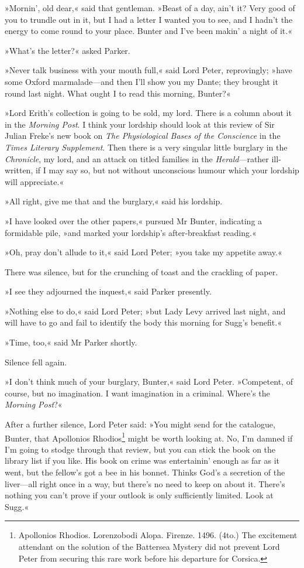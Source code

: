 »Mornin', old dear,« said that gentleman. »Beast of a day, ain't it? Very good of you to trundle out in it, but I had a letter I wanted you to see, and I hadn't the energy to come round to your place. Bunter and I've been makin' a night of it.«

»What's the letter?« asked Parker.

»Never talk business with your mouth full,« said Lord Peter, reprovingly; »have some Oxford marmalade\allowbreak---\allowbreak and then I'll show you my Dante; they brought it round last night. What ought I to read this morning, Bunter?«

»Lord Erith's collection is going to be sold, my lord. There is a column about it in the \textit{Morning Post}. I think your lordship should look at this review of Sir Julian Freke's new book on \textit{The Physiological Bases of the Conscience} in the \textit{Times Literary Supplement}. Then there is a very singular little burglary in the \textit{Chronicle}, my lord, and an attack on titled families in the \textit{Herald}---rather ill-written, if I may say so, but not without unconscious humour which your lordship will appreciate.«

»All right, give me that and the burglary,« said his lordship.

»I have looked over the other papers,« pursued Mr Bunter, indicating a formidable pile, »and marked your lordship's after-breakfast reading.«

»Oh, pray don't allude to it,« said Lord Peter; »you take my appetite away.«

There was silence, but for the crunching of toast and the crackling of paper.

»I see they adjourned the inquest,« said Parker presently.

»Nothing else to do,« said Lord Peter; »but Lady Levy arrived last night, and will have to go and fail to identify the body this morning for Sugg's benefit.«

»Time, too,« said Mr Parker shortly.

Silence fell again.

»I don't think much of your burglary, Bunter,« said Lord Peter. »Competent, of course, but no imagination. I want imagination in a criminal. Where's the \textit{Morning Post}?«

After a further silence, Lord Peter said: »You might send for the catalogue, Bunter, that Apollonios Rhodios\footnote{Apollonios Rhodios. Lorenzobodi Alopa. Firenze. 1496. (4to.) The excitement attendant on the solution of the Battersea Mystery did not prevent Lord Peter from securing this rare work before his departure for Corsica.} might be worth looking at. No, I'm damned if I'm going to stodge through that review, but you can stick the book on the library list if you like. His book on crime was entertainin' enough as far as it went, but the fellow's got a bee in his bonnet. Thinks God's a secretion of the liver\allowbreak---\allowbreak all right once in a way, but there's no need to keep on about it. There's nothing you can't prove if your outlook is only sufficiently limited. Look at Sugg.«

